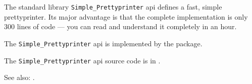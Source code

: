 
The standard library {\tt Simple\_Prettyprinter} api defines 
a fast, simple prettyprinter.  Its major advantage is that 
the complete implementation is only 300 lines of code --- you 
can read and understand it completely in an hour.

The {\tt Simple\_Prettyprinter} api is implemented by the  package.

The {\tt Simple\_Prettyprinter} api source code is in .

See also: .




